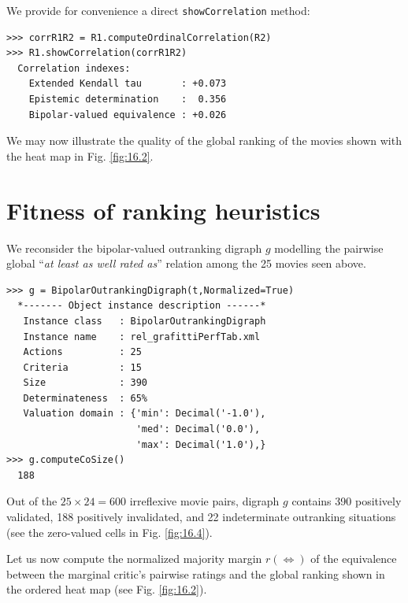 We provide for convenience a direct \texttt{showCorrelation} method:

\begin{lstlisting}
>>> corrR1R2 = R1.computeOrdinalCorrelation(R2)
>>> R1.showCorrelation(corrR1R2)
  Correlation indexes:
    Extended Kendall tau       : +0.073
    Epistemic determination    :  0.356
    Bipolar-valued equivalence : +0.026
\end{lstlisting}

We may now illustrate the quality of the global ranking of the movies shown with the heat map in Fig. \ref{fig:16.2}. 

\section{Fitness of ranking heuristics}
\label{sec:16.3}

We reconsider the bipolar-valued outranking digraph $g$ modelling the pairwise global ``\emph{at least as well rated as}'' relation among the 25 movies seen above.

\begin{lstlisting}[caption={Global movies outranking digraph},label=list:16.6]
>>> g = BipolarOutrankingDigraph(t,Normalized=True)
  *------- Object instance description ------*
   Instance class   : BipolarOutrankingDigraph
   Instance name    : rel_grafittiPerfTab.xml
   Actions          : 25
   Criteria         : 15
   Size             : 390
   Determinateness  : 65%
   Valuation domain : {'min': Decimal('-1.0'),
                       'med': Decimal('0.0'),
                       'max': Decimal('1.0'),}
>>> g.computeCoSize()
  188
\end{lstlisting}

Out of the $25 \times 24 = 600$ irreflexive movie pairs, digraph $g$ contains 390 positively validated, 188 positively invalidated, and 22 indeterminate outranking situations (see the zero-valued cells in Fig. \ref{fig:16.4}).

Let us now compute the normalized majority margin $r(\Leftrightarrow)$  of the equivalence between the marginal critic's pairwise ratings and the global \NetFlows ranking shown in the ordered heat map (see Fig. \ref{fig:16.2}).

